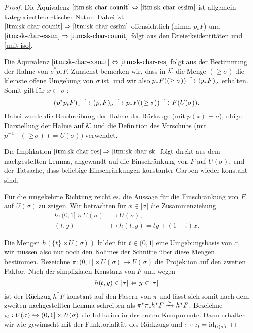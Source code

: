 \begin{proof}
  Die Äquivalenz $\ref{itm:sk-char-counit} \Leftrightarrow
  \ref{itm:sk-char-essim}$ ist allgemein kategorientheoretischer
  Natur. Dabei ist $\ref{itm:sk-char-counit} \Rightarrow
  \ref{itm:sk-char-essim}$ offensichtlich (nimm $p_* F$) und
  $\ref{itm:sk-char-essim} \Rightarrow \ref{itm:sk-char-counit}$ folgt
  aus den Dreiecksidentitäten und \ref{unit-iso}.

  Die Äquivalenz $\ref{itm:sk-char-counit} \Leftrightarrow \ref{itm:sk-char-res}$
  folgt aus der Bestimmung der Halme von $p^*p_* F$. Zunächst bemerken
  wir, dass in $\mathcal{K}$ die Menge $(\geq \sigma)$ die kleinste offene
  Umgebung von $\sigma$ ist, und wir also $p_*F((\geq \sigma)) \xrightarrow[]{\sim}
  (p_*F)_{\sigma}$ erhalten. Somit gilt für $x \in |\sigma|$:
  \begin{equation}\label{eq:counit-sect}
    (p^*p_*F)_x \xrightarrow[]{\sim} (p_*F)_{\sigma} \xrightarrow[]{\sim} p_*F((\geq \sigma)) \xrightarrow[]{\sim} F(U(\sigma)).  
  \end{equation}  
  Dabei wurde die Beschreibung der Halme des Rückzugs (mit $p(x) =
  \sigma$), obige Darstellung der Halme auf $\mathcal{K}$ und die Definition
  des Vorschubs (mit $p^{-1}((\geq \sigma)) = U(\sigma)$) verwendet.

  Die Implikation $\ref{itm:sk-char-res} \Rightarrow
  \ref{itm:sk-char-sk}$ folgt direkt aus dem nachgestellten Lemma,
  angewandt auf die Einschränkung von $F$ auf $U(\sigma)$, und der
  Tatsache, dass beliebige Einschränkungen konstanter Garben wieder
  konstant sind.

  Für die umgekehrte Richtung reicht es, die Aussage für die
  Einschränkung von $F$ auf $U(\sigma)$ zu zeigen.  Wir betrachten für
  $x \in |\sigma|$ die Zusammenziehung
  \begin{align*}
    h: (0, 1] \times U(\sigma) &\to U(\sigma), \\
    (t, y) &\mapsto h(t, y) = t y + (1 - t) x.
  \end{align*}
  
  Die Mengen $h(\{t\} \times U(\sigma))$ bilden für $t \in (0, 1]$
  eine Umgebungsbasis von $x$, wir müssen also nur noch den Kolimes
  der Schnitte über diese Mengen bestimmen. Bezeichne $\pi: (0, 1]
  \times U(\sigma) \to U(\sigma)$ die Projektion auf den zweiten
  Faktor. Nach der simplizialen Konstanz von $F$ und wegen
  \[ h(t, y) \in |\tau| \Leftrightarrow y \in |\tau| \]
  ist der Rückzug $h^* F$ konstant auf den Fasern von $\pi$ und lässt
  sich somit nach dem zweiten nachgestellten Lemma schreiben als
  $\pi^* \pi_* h^* F \xrightarrow[]{\sim} h^* F$. Bezeichne $\iota_t: U(\sigma)
  \xhookrightarrow{} (0, 1] \times U(\sigma)$ die Inklusion in der
    ersten Komponente. Dann erhalten wir wie gewünscht mit der
    Funktorialität des Rückzugs und $\pi \circ \iota_t =
    \operatorname{id}_{U(\sigma)}$


\end{proof}
